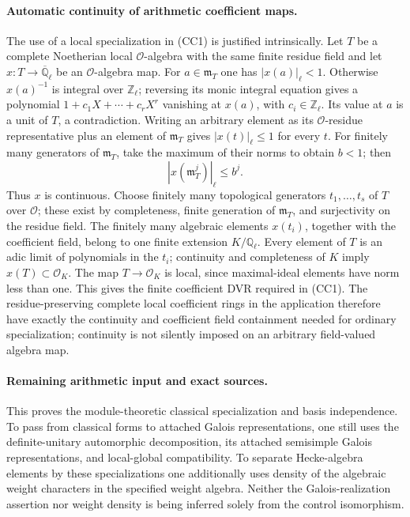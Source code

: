 \paragraph{Automatic continuity of arithmetic coefficient maps.}
The use of a local specialization in (CC1) is justified
intrinsically.  Let \(T\) be a complete Noetherian local
\(\mathcal O\)-algebra with the same finite residue field and let
\(x:T\to\overline{\mathbb Q}_\ell\) be an
\(\mathcal O\)-algebra map.
For \(a\in\mathfrak m_T\) one has \(|x(a)|_\ell<1\).
Otherwise \(x(a)^{-1}\) is integral over \(\mathbb Z_\ell\);
reversing its monic integral equation gives a polynomial
\(1+c_1X+\cdots+c_rX^r\) vanishing at \(x(a)\), with
\(c_i\in\mathbb Z_\ell\).
Its value at \(a\) is a unit of \(T\), a contradiction.
Writing an arbitrary element as its \(\mathcal O\)-residue
representative plus an element of \(\mathfrak m_T\) gives
\(|x(t)|_\ell\leq1\) for every \(t\).
For finitely many generators of \(\mathfrak m_T\), take the maximum
of their norms to obtain \(b<1\); then
\[
 |x(\mathfrak m_T^j)|_\ell\leq b^j.
\]
Thus \(x\) is continuous.  Choose finitely many topological
generators \(t_1,\ldots,t_s\) of \(T\) over \(\mathcal O\); these
exist by completeness, finite generation of \(\mathfrak m_T\), and
surjectivity on the residue field.  The finitely many algebraic
elements \(x(t_i)\), together with the coefficient field, belong to
one finite extension \(K/\mathbb Q_\ell\).
Every element of \(T\) is an adic limit of polynomials in the
\(t_i\); continuity and completeness of \(K\) imply
\(x(T)\subset\mathcal O_K\).
The map \(T\to\mathcal O_K\) is local, since maximal-ideal elements
have norm less than one.
This gives the finite coefficient DVR required in (CC1).
The residue-preserving complete local coefficient rings in the
application therefore have exactly the continuity and coefficient
field containment needed for ordinary specialization; continuity is
not silently imposed on an arbitrary field-valued algebra map.

\paragraph{Remaining arithmetic input and exact sources.}
This proves the module-theoretic classical specialization and
basis independence.  To pass from classical forms to attached
Galois representations, one still uses the definite-unitary
automorphic decomposition, its attached semisimple Galois
representations, and local-global compatibility.  To separate
Hecke-algebra elements by these specializations one additionally
uses density of the algebraic weight characters in the specified
weight algebra.  Neither the Galois-realization assertion nor
weight density is being inferred solely from the control
isomorphism.

